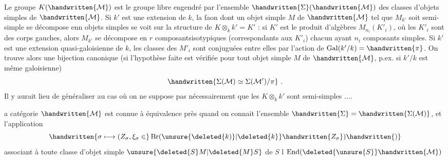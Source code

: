 Le groupe $K(\handwritten{\mathcal{M}})$ est le groupe libre engendré par l'ensemble $\handwritten{\Sigma}(\handwritten{\mathcal{M}})$ des classes d'objets simples de $\handwritten{\mathcal{M}}$. Si $k'$ est une extension de $k$, la faon dont un objet simple $M$ de $\handwritten{\mathcal{M}}$ tel que $M_{k'}$ soit semi-simple se décompose enn objets simples se voit sur la structure de $K\otimes_k k'=K'$ : si $K'$ est le produit d'algèbres $M_{n_i}(K'_i)$, où les $K'_i$ sont des corps gauches, alors $M_{k'}$ se décompose en $r$ composantsisotypiques (correspondants aux $K'_i$) chacun ayant $n_i$ composants simples. Si $k'$ est une extension quasi-galoisienne de $k$, les classes des $M'_i$ sont conjuguées entre elles par l'action de $\operatorname{Gal}(k'/k)=\handwritten{\pi}$. On trouve alors une bijection canonique (si l'hypothèse faite est vérifiée pour tout objet simple  $M$ de $\handwritten{\mathcal{M}}$, p.ex. si $k'/k$ est même galoisienne)
\[
\handwritten{\Sigma(\mathcal{M})\simeq\Sigma(\mathcal{M}')/\pi}\ .
\]
Il y aurait lieu de généraliser au cas où on ne suppose pas nécessairement que les $K\otimes_k k'$ sont semi-simples ....

 a catégorie $\handwritten{\mathcal{M}}$ est connue à équivalence près quand on connait l'ensemble $\handwritten{\Sigma}=\handwritten{\Sigma(\mathcal{M})}$, et l'application
\[
\handwritten{\sigma\longmapsto (Z_\sigma,\xi_\sigma\in}\operatorname{Br}(\unsure{\deleted{k)}|\deleted{k}}\handwritten{Z_\sigma})\handwritten{)}
\]
associant à toute classe d'objet simple $\unsure{\deleted{S}M|\deleted{M}S}$ de $S$ l  $\operatorname{End}(\deleted{\unsure{S}}\handwritten{\mathcal{M}})$
